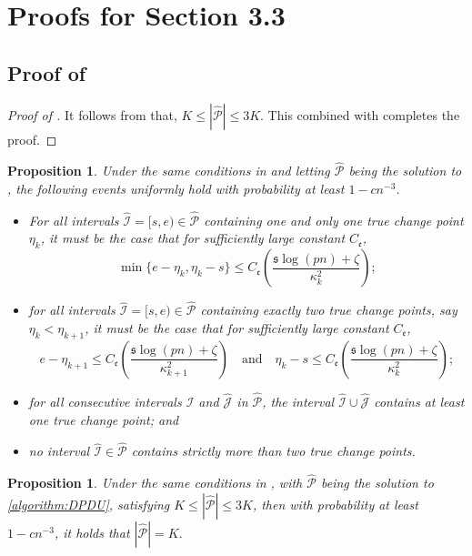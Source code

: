 \documentclass[11pt]{article}
\newcommand{\I}{{\mathcal I }}
\newcommand{\J}{{  \mathcal J } }
\newcommand{\hatp}{  {\widehat  { \mathcal P }  } }
\newcommand{\s}{ { \mathfrak{s}  } }
\theoremstyle{plain}
\newtheorem{proposition}[theorem]{Proposition}
\theoremstyle{definition}
\begin{document}
\section{Proofs for Section 3.3}\label{sec-app-pre}  
\subsection[]{Proof of }
\begin{proof}[Proof of ]
	It follows from  that, $K \leq |\widehat{\mathcal{P}}| \leq 3K$.  This combined with  completes the proof.
\end{proof} 

\begin{proposition}\label{prop-1}
Under the same conditions in  and letting $\widehat{\mathcal{P}}$ being the solution to , the following events uniformly hold with probability at least $1 - cn^{-3}$. 
	\begin{itemize}
		\item [(i)] For all intervals  $\widehat \I = [s, e) \in \widehat{\mathcal{P}}$    containing one and only one true change point $\eta_k$, it must be the case that for sufficiently large constant $ C_{\mathfrak e} $, 
			\[
				\min\{e - \eta_k, \eta_k - s\} \leq C_{\mathfrak e} \left(\frac{ \s \log(pn)  + \zeta }{\kappa_k^2}\right);
			\]
		\item [(ii)] for all intervals  $\widehat \I = [s, e) \in \widehat{\mathcal{P}}$ containing exactly two true change points, say  $\eta_k < \eta_{k+1} $, it must be the case that for sufficiently large constant $ C_{\mathfrak e} $, 
			\[
				    e - \eta_{k+1}\leq  C_{\mathfrak e}  \left(\frac{\s \log(pn)  + \zeta }{\kappa_{k+1}^2}\right)    \quad \text{and} \quad 
				   \eta_k - s  \leq  C_{\mathfrak e}  \left(\frac{\s \log(pn)  + \zeta}{\kappa_{k }^2}\right);	
			\]  
		\item [(iii)] for all consecutive intervals $\widehat \I$ and $\widehat {\J}$ in $\hatp $, the interval $\widehat \I \cup \widehat{\J}$ contains at least one true change point; and
		\item [(iv)] no interval $\widehat \I \in \widehat{\mathcal{P}}$ contains strictly more than two true change points.
	 \end{itemize}
\end{proposition} 






\begin{proposition}\label{prop-2}
Under the same conditions in , with $\widehat{\mathcal{P}}$ being the solution to \eqref{algorithm:DPDU}, satisfying $K \leq |\widehat{\mathcal{P}}| \leq 3K$, then with probability at least $1 -   cn  ^{-3}$, it holds that $|\widehat{\mathcal{P}}| = K$.	
\end{proposition}
\end{document}
